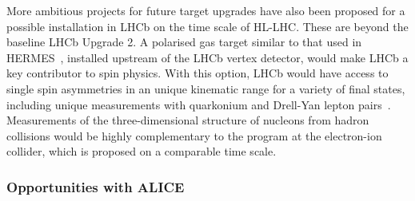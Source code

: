 \documentclass[../report.tex]{subfiles}
\begin{document}
More ambitious projects for future target upgrades have also been proposed for a possible installation
in LHCb on the time scale of HL-LHC. These are beyond the baseline
LHCb Upgrade 2. A polarised gas target similar to that used in
HERMES~\cite{Airapetian:2004yf}, installed upstream of the LHCb vertex
detector, would make LHCb a key contributor to spin physics. 
With this option, LHCb would have access to single spin asymmetries in an
unique kinematic range for a variety of final states, including unique
measurements with quarkonium and Drell-Yan lepton
pairs~\cite{Kikola:2017hnp}. 
Measurements of the three-dimensional structure of nucleons from hadron collisions would be highly
complementary to the program at the electron-ion collider, which is proposed on a
comparable time scale.


\subsubsection{Opportunities with ALICE}
\label{sec:FTALICE}
\end{document}
